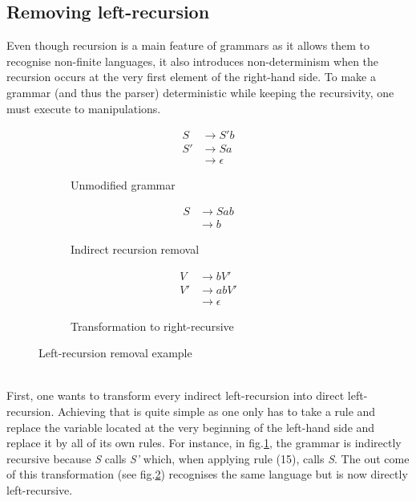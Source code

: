 \documentclass[a4paper,11pt]{article}
\begin{document}
  \subsection{Removing left-recursion}
    \label{sec:leftrecursion}
    Even though recursion is a main feature of grammars as it allows them to recognise non-finite languages, it also introduces non-determinism when the recursion occurs at the very first element of the right-hand side. To make a grammar (and thus the parser) deterministic while keeping the recursivity, one must execute to manipulations.
    \begin{figure}[h!]
      \centering
      \begin{subfigure}[b]{0.33\textwidth}
	  \centering
	  \begin{align}
	    S  &\rightarrow S'b \\
	    S' &\rightarrow Sa \\
		&\rightarrow \epsilon
	  \end{align}
	  \caption{Unmodified grammar}
	  \label{fig:unmodifiedgrammar2}
      \end{subfigure}%
      \begin{subfigure}[b]{0.33\textwidth}
	  \centering
	  \begin{align}
	    S  &\rightarrow Sab \\
		&\rightarrow b
	  \end{align}
	  \caption{Indirect recursion removal}
	  \label{fig:indirectremovalgrammar2}
      \end{subfigure}
      \begin{subfigure}[b]{0.33\textwidth}
	  \centering
	  \begin{align}
	    V  &\rightarrow bV' \\
	    V' &\rightarrow abV' \\
		&\rightarrow \epsilon
	  \end{align}
	  \caption{Transformation to right-recursive}
	  \label{fig:rightrecursivegrammar2}
      \end{subfigure}
      \caption{Left-recursion removal example}
    \end{figure}\\
    First, one wants to transform every indirect left-recursion into direct left-recursion. Achieving that is quite simple as one only has to take a rule and replace the variable located at the very beginning of the left-hand side and replace it by all of its own rules. For instance, in fig.\ref{fig:unmodifiedgrammar2}, the grammar is indirectly recursive because \textit{S} calls \textit{S'} which, when applying rule (15), calls \textit{S}. The out come of this transformation (see fig.\ref{fig:indirectremovalgrammar2}) recognises the same language but is now directly left-recursive.\\
\end{document}
